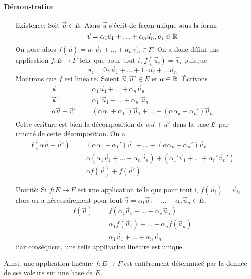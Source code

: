 \paragraph{Démonstration}
\begin{itemize}
  \item[Existence:] Soit $\vec{u} \in E$. Alors $\vec{u}$ s'écrit de façon unique sous la forme
    $$\vec{u} = \alpha_1 \vec{u}_1 + \ldots + \alpha_n \vec{u}_n, \alpha_i \in \mathbb{R}$$
    On pose alors $f(\vec{u}) = \alpha_1 \vec{v}_1 + \ldots + \alpha_n \vec{v}_n \in F$. On a donc défini une application $f: E \rightarrow F$ telle que pour tout $i$, $f(\vec{u}_i) = \vec{v}_i$ puisque
    $$\vec{u}_i = 0 \cdot \vec{u}_1 + \ldots + 1 \cdot \vec{u}_i + \ldots \vec{u}_n$$
    Montrons que $f$ est linéaire. Soient $\vec{u}, \vec{u}' \in E$ et $\alpha \in \mathbb{R}$. Écrivons 
    \begin{eqnarray*}
      \vec{u} &=& \alpha_1 \vec{u}_1 + \ldots + \alpha_n \vec{u}_n \\
      \vec{u}' &=& \alpha_1' \vec{u}_1 + \ldots + \alpha_n' \vec{u}_n \\
      \alpha \vec{u} + \vec{u}' &=& (\alpha \alpha_1 + \alpha_1') \vec{u}_1 + \ldots + (\alpha \alpha_n + \alpha_n') \vec{u}_n \\
    \end{eqnarray*}
    Cette écriture est bien la décomposition de $\alpha \vec{u} + \vec{u}'$ dans la base $\mathcal{B}$ par unicité de cette décomposition. On a
    \begin{eqnarray*}
      f(\alpha \vec{u} + \vec{u}') &=& (\alpha \alpha_1 + \alpha_1') \vec{v}_1 + \ldots + (\alpha \alpha_n + \alpha_n') \vec{v}_n \\
        &=& \alpha ( \alpha_1 \vec{v}_1 + \ldots + \alpha_n \vec{v}_n ) + (\alpha_1' \vec{v}_1 + \ldots + \alpha_n' \vec{v}_n') \\
        &=& \alpha f(\vec{u}) + f(\vec{u}')
    \end{eqnarray*}
    
  \item[Unicité:] Si $f: E \rightarrow F$ est une application telle que pour tout i, $f(\vec{u}_i) = \vec{v}_i$, alors on a nécessairement pour tout $\vec{u} = \alpha_1 \vec{u}_1 + \ldots + \alpha_n \vec{u}_n \in E$,
    \begin{eqnarray*}
      f(\vec{u}) &=& f(\alpha_1 \vec{u}_1 + \ldots + \alpha_n \vec{u}_n) \\
       &=& \alpha_1 f(\vec{u}_1) + \ldots + \alpha_n f(\vec{u}_n) \\
       &=& \alpha_1 \vec{v}_1 + \ldots + \alpha_n \vec{v}_n.
    \end{eqnarray*}
    Par conséquent, une telle application linéaire est unique.
\end{itemize}
Ainsi, une application linéaire $f: E \rightarrow F$ est entièrement détermineé par la donnée de ses valeurs sur une base de $E$.

